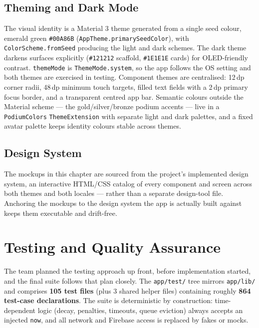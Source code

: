 \documentclass{configurations/polimi3i_thesis}
\renewcommand{\_}{\textunderscore\allowbreak}
\begin{document}
\section{Theming and Dark Mode}
\label{sec:theming}
The visual identity is a Material 3 theme generated from a single seed colour, emerald green \texttt{\#00A86B} (\texttt{AppTheme.primarySeedColor}), with \texttt{ColorScheme.fromSeed} producing the light and dark schemes. The dark theme darkens surfaces explicitly (\texttt{\#121212} scaffold, \texttt{\#1E1E1E} cards) for OLED-friendly contrast. \texttt{themeMode} is \texttt{ThemeMode.system}, so the app follows the OS setting and both themes are exercised in testing. Component themes are centralised: 12\,dp corner radii, 48\,dp minimum touch targets, filled text fields with a 2\,dp primary focus border, and a transparent centred app bar. Semantic colours outside the Material scheme — the gold/silver/bronze podium accents — live in a \texttt{PodiumColors} \texttt{ThemeExtension} with separate light and dark palettes, and a fixed avatar palette keeps identity colours stable across themes.

\section{Design System}
\label{sec:design_system}
The mockups in this chapter are sourced from the project's implemented design system, an interactive HTML/CSS catalog of every component and screen across both themes and both locales — rather than a separate design-tool file. Anchoring the mockups to the design system the app is actually built against keeps them executable and drift-free.


\chapter{Testing and Quality Assurance}
\label{ch:testing_quality}

The team planned the testing approach up front, before implementation started, and the final suite follows that plan closely. The \texttt{app/test/} tree mirrors \texttt{app/lib/} and comprises \textbf{105 test files} (plus 3 shared helper files) containing roughly \textbf{864 test-case declarations}. The suite is deterministic by construction: time-dependent logic (decay, penalties, timeouts, queue eviction) always accepts an injected \texttt{now}, and all network and Firebase access is replaced by fakes or mocks.
\end{document}
